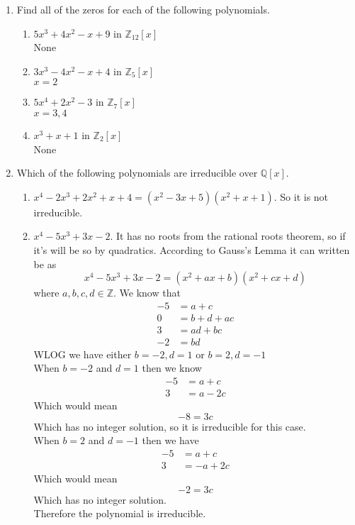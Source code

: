 \documentclass[12pt]{article}
\newcommand\setitemnumber[1]{\setcounter{enumi}{\numexpr#1-- -1\relax}}
\begin{document}
\begin{enumerate}[label=\textbf{\arabic*}.]
          \setitemnumber{5}
          \item Find all of the zeros for each of the following polynomials.
          \begin{enumerate}
              \item $5x^3+4x^2-x+9$ in $\mathbb{Z}_{12}[x]$ \\
              None

              \item $3x^3-4x^2-x+4$ in $\mathbb{Z}_{5}[x]$ \\
              $x=2$

              \item $5x^4+2x^2-3$ in $\mathbb{Z}_{7}[x]$ \\
              $x = 3,4$

              \item $x^3+x+1$ in $\mathbb{Z}_{2}[x]$ \\
              None
          \end{enumerate}
          
          \setitemnumber{8}
          \item Which of the following polynomials are irreducible over $\mathbb{Q}[x]$.
          \begin{enumerate}
              \item $x^4-2x^3+2x^2+x+4 = (x^2-3x+5)(x^2+x+1)$. So it is not irreducible.
              \item $x^4-5x^3+3x-2$. It has no roots from the rational roots theorem, so if it's will 
              be so by quadratics. According to Gauss's Lemma it can written be as 
              \[x^4-5x^3+3x-2 = (x^2+ax+b)(x^2+cx+d)\]
              where $a,b,c,d \in \mathbb{Z}$.
              We know that
              \begin{align*}
                  -5 &= a+c \\
                  0 &= b+d+ac \\
                  3 &= ad+bc \\
                  -2 &= bd
              \end{align*}
              WLOG we have either $b=-2, d = 1$ or $b=2, d=-1$ \\
              When $b=-2$ and $d=1$ then we know
              \begin{align*}
                  -5 &= a+c \\
                  3 &= a-2c
              \end{align*}
              Which would mean 
              \[-8 = 3c\]
              Which has no integer solution, so it is irreducible for this case. \\
              When $b=2$ and $d=-1$ then we have
              \begin{align*}
                  -5 &= a+c \\
                  3 &= -a+2c
              \end{align*}
              Which would mean
              \[-2=3c\]
              Which has no integer solution. \\
              Therefore the polynomial is irreducible.


\end{enumerate}
\end{enumerate}
\end{document}
